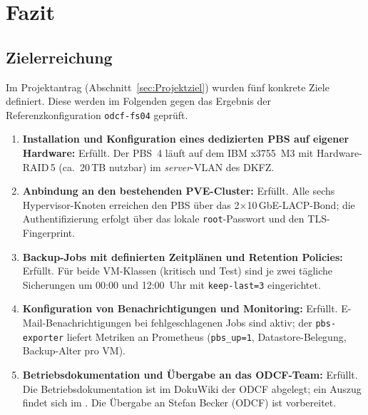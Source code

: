 \section{Fazit}
\label{sec:Fazit}

\subsection{Zielerreichung}
\label{sec:Zielerreichung}

Im Projektantrag (Abschnitt~\ref{sec:Projektziel}) wurden fünf
konkrete Ziele definiert. Diese werden im Folgenden gegen das
Ergebnis der Referenzkonfiguration \texttt{odcf-fs04} geprüft.

\begin{enumerate}\setlength{\itemsep}{2pt}
    \item \textbf{Installation und Konfiguration eines dedizierten
          \ac{PBS} auf eigener Hardware:} Erfüllt. Der \ac{PBS}~4
          läuft auf dem IBM x3755~M3 mit Hardware-\ac{RAID}\,5
          (ca.~20\,TB nutzbar) im \emph{server}-\ac{VLAN} des
          \ac{DKFZ}.
    \item \textbf{Anbindung an den bestehenden \ac{PVE}-Cluster:}
          Erfüllt. Alle sechs Hypervisor-Knoten erreichen den
          \ac{PBS} über das 2$\times$10\,\ac{GbE}-\ac{LACP}-Bond;
          die Authentifizierung erfolgt über das lokale
          \texttt{root}-Passwort und den TLS-Fingerprint.
    \item \textbf{Backup-Jobs mit definierten Zeitplänen und
          Retention Policies:} Erfüllt. Für beide \ac{VM}-Klassen
          (kritisch und Test) sind je zwei tägliche
          Sicherungen um 00:00 und 12:00~Uhr mit
          \texttt{keep-last=3} eingerichtet.
    \item \textbf{Konfiguration von Benachrichtigungen und
          Monitoring:} Erfüllt. E-Mail-Benachrichtigungen bei
          fehlgeschlagenen Jobs sind aktiv; der
          \texttt{pbs-exporter} liefert Metriken an Prometheus
          (\texttt{pbs\_up=1}, Datastore-Belegung, Backup-Alter
          pro \ac{VM}).
    \item \textbf{Betriebsdokumentation und Übergabe an das
          \ac{ODCF}-Team:} Erfüllt. Die Betriebsdokumentation
          ist im DokuWiki der \ac{ODCF} abgelegt; ein Auszug
          findet sich im . Die Übergabe
          an Stefan Becker (\ac{ODCF}) ist vorbereitet.
\end{enumerate}

